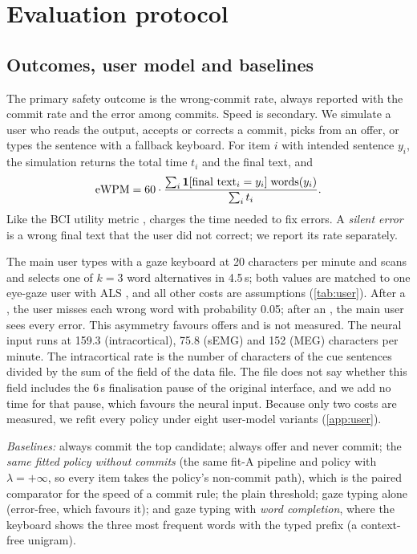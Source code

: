 \section{Evaluation protocol}
\label{sec:protocol}

\subsection{Outcomes, user model and baselines}
The primary safety outcome is the wrong-commit rate, always reported with the commit rate and the error among commits. Speed is secondary. We simulate a user who reads the output, accepts or corrects a commit, picks from an offer, or types the sentence with a fallback keyboard. For item $i$ with intended sentence $y_i$, the simulation returns the total time $t_i$ and the final text, and
\begin{equation}
  \text{eWPM{}} = 60 \cdot \frac{\sum_i \mathbf{1}[\text{final text}_i = y_i]\;\mathrm{words}(y_i)}{\sum_i t_i}.
\end{equation}
Like the BCI utility metric \citep{dalseno2010utility}, \ewpm{} charges the time needed to fix errors. A \emph{silent error} is a wrong final text that the user did not correct; we report its rate separately.

The main user types with a gaze keyboard at 20 characters per minute and scans and selects one of $k = 3$ word alternatives in 4.5\,s; both values are matched to one eye-gaze user with ALS \citep{cai2024gaze}, and all other costs are assumptions (\cref{tab:user}). After a , the user misses each wrong word with probability 0.05; after an , the main user sees every error. This asymmetry favours offers and is not measured. The neural input runs at 159.3 (intracortical), 75.8 (sEMG) and 152 (MEG) characters per minute. The intracortical rate is the number of characters of the cue sentences divided by the sum of the  field of the data file. The file does not say whether this field includes the 6\,s finalisation pause of the original interface, and we add no time for that pause, which favours the neural input. Because only two costs are measured, we refit every policy under eight user-model variants (\cref{app:user}).

\emph{Baselines:} always commit the top candidate; always offer and never commit; the \emph{same fitted policy without commits} (the same fit-A pipeline and policy with $\lambda = +\infty$, so every item takes the policy's non-commit path), which is the paired comparator for the speed of a commit rule; the plain threshold; gaze typing alone (error-free, which favours it); and gaze typing with \emph{word completion}, where the keyboard shows the three most frequent words with the typed prefix (a context-free unigram).


